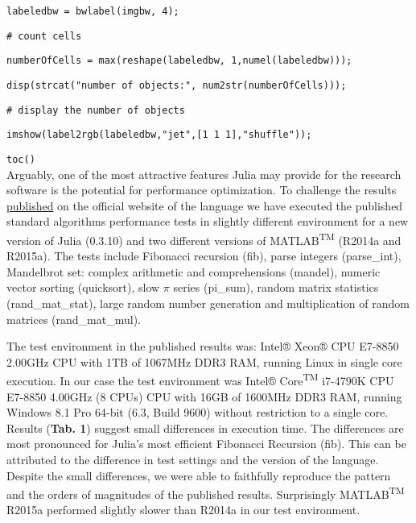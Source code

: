 \verb|labeledbw = bwlabel(imgbw, 4);|

\verb|# count cells|

\verb|numberOfCells = max(reshape(labeledbw, 1,numel(labeledbw)));|

\verb|disp(strcat("number of objects:", num2str(numberOfCells)));|

\verb|# display the number of objects|

\verb|imshow(label2rgb(labeledbw,"jet",[1 1 1],"shuffle"));|

\verb|toc()|\\



Arguably, one of the most attractive features Julia may provide for the research software is the potential for performance optimization. To challenge the results \href{http://julialang.org/benchmarks/}{published} on the official website of the language we have executed the published standard algorithms performance tests in slightly different environment for a new version of Julia (0.3.10) and two different versions of MATLAB\textsuperscript{TM} (R2014a and R2015a). The tests include Fibonacci recursion (fib), parse integers (parse\_int), Mandelbrot set: complex arithmetic and comprehensions (mandel), numeric vector sorting (quicksort), slow $\pi$ series (pi\_sum), random matrix statistics (rand\_mat\_stat), large random number generation and multiplication of random matrices (rand\_mat\_mul).

The test environment in the published results was: Intel® Xeon® CPU E7-8850 2.00GHz CPU with 1TB of 1067MHz DDR3 RAM, running Linux in single core execution. In our case the test environment was Intel® Core\textsuperscript{TM} i7-4790K CPU E7-8850 4.00GHz (8 CPUs) CPU with 16GB of 1600MHz DDR3 RAM, running Windows 8.1 Pro 64-bit (6.3, Build 9600) without restriction to a single core. Results (\textbf{Tab. 1}) suggest small differences in execution time. The differences are most pronounced for Julia's most efficient Fibonacci Recursion (fib). This can be attributed to the difference in test settings and the version of the language. Despite the small differences, we were able to faithfully reproduce the pattern and the orders of magnitudes of the published results. Surprisingly MATLAB\textsuperscript{TM} R2015a performed slightly slower than R2014a in our test environment.

